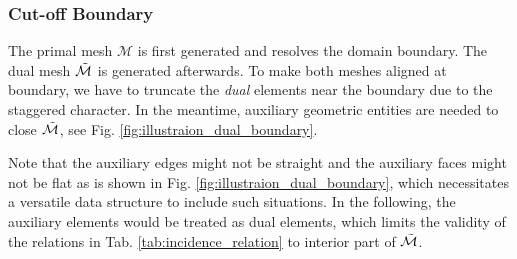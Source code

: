 \documentclass{article}
\begin{document}
\subsubsection{Cut-off Boundary}
The primal mesh $\mathcal{M}$ is first generated and resolves the domain boundary. The dual mesh $\Tilde{\mathcal{M}}$ is generated afterwards. To make both meshes aligned at boundary, we have to truncate the \emph{dual} elements near the boundary due to the staggered character. In the meantime, auxiliary geometric entities are needed to close $\Tilde{\mathcal{M}}$, see Fig. \ref{fig:illustraion_dual_boundary}.

Note that the auxiliary edges might not be straight and the auxiliary faces might not be flat as is shown in Fig. \ref{fig:illustraion_dual_boundary}, which necessitates a versatile data structure to include such situations. In the following, the auxiliary elements would be treated as dual elements, which limits the validity of the relations in Tab. \ref{tab:incidence_relation} to interior part of $\Tilde{\mathcal{M}}$.
\end{document}
